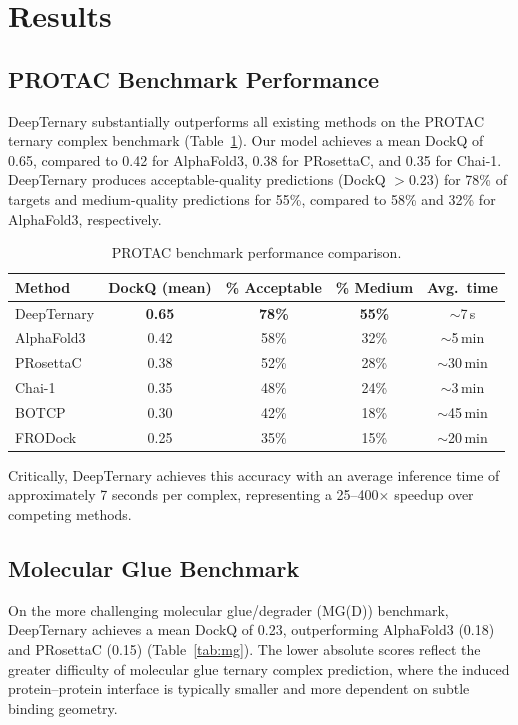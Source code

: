 \documentclass[11pt]{article}
\begin{document}
\section{Results}

\subsection{PROTAC Benchmark Performance}

DeepTernary substantially outperforms all existing methods on the PROTAC ternary complex benchmark (Table~\ref{tab:protac}). Our model achieves a mean DockQ of 0.65, compared to 0.42 for AlphaFold3, 0.38 for PRosettaC, and 0.35 for Chai-1. DeepTernary produces acceptable-quality predictions (DockQ $> 0.23$) for 78\% of targets and medium-quality predictions for 55\%, compared to 58\% and 32\% for AlphaFold3, respectively.

\begin{table}[h]
\centering
\caption{PROTAC benchmark performance comparison.}
\label{tab:protac}
\begin{tabular}{lcccc}
\toprule
Method & DockQ (mean) & \% Acceptable & \% Medium & Avg.\ time \\
\midrule
DeepTernary & \textbf{0.65} & \textbf{78\%} & \textbf{55\%} & $\sim$7\,s \\
AlphaFold3 & 0.42 & 58\% & 32\% & $\sim$5\,min \\
PRosettaC & 0.38 & 52\% & 28\% & $\sim$30\,min \\
Chai-1 & 0.35 & 48\% & 24\% & $\sim$3\,min \\
BOTCP & 0.30 & 42\% & 18\% & $\sim$45\,min \\
FRODock & 0.25 & 35\% & 15\% & $\sim$20\,min \\
\bottomrule
\end{tabular}
\end{table}

Critically, DeepTernary achieves this accuracy with an average inference time of approximately 7 seconds per complex, representing a 25--400$\times$ speedup over competing methods.

\subsection{Molecular Glue Benchmark}

On the more challenging molecular glue/degrader (MG(D)) benchmark, DeepTernary achieves a mean DockQ of 0.23, outperforming AlphaFold3 (0.18) and PRosettaC (0.15) (Table~\ref{tab:mg}). The lower absolute scores reflect the greater difficulty of molecular glue ternary complex prediction, where the induced protein--protein interface is typically smaller and more dependent on subtle binding geometry.
\end{document}
